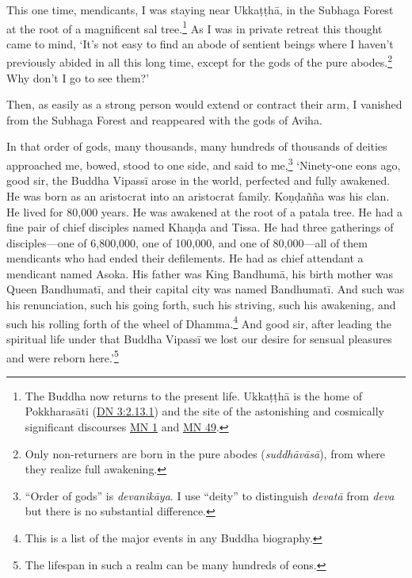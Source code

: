 \documentclass[12pt,openany]{book}%
\begin{document}
This one time, mendicants, I was staying near \textsanskrit{Ukkaṭṭhā}, in the Subhaga Forest at the root of a magnificent sal tree.\footnote{The Buddha now returns to the present life. \textsanskrit{Ukkaṭṭhā} is the home of \textsanskrit{Pokkharasāti} (\href{https://suttacentral.net/dn3/en/sujato\#2.13.1}{DN 3:2.13.1}) and the site of the astonishing and cosmically significant discourses \href{https://suttacentral.net/mn1/en/sujato}{MN 1} and \href{https://suttacentral.net/mn49/en/sujato}{MN 49}. } As I was in private retreat this thought came to mind, ‘It’s not easy to find an abode of sentient beings where I haven’t previously abided in all this long time, except for the gods of the pure abodes.\footnote{Only non-returners are born in the pure abodes (\textit{\textsanskrit{suddhāvāsā}}), from where they realize full awakening. } Why don’t I go to see them?’ 

Then, as easily as a strong person would extend or contract their arm, I vanished from the Subhaga Forest and reappeared with the gods of Aviha. 

In that order of gods, many thousands, many hundreds of thousands of deities approached me, bowed, stood to one side, and said to me,\footnote{“Order of gods” is \textit{\textsanskrit{devanikāya}}. I use “deity” to distinguish \textit{\textsanskrit{devatā}} from \textit{deva} but there is no substantial difference. } ‘Ninety-one eons ago, good sir, the Buddha \textsanskrit{Vipassī} arose in the world, perfected and fully awakened. He was born as an aristocrat into an aristocrat family. \textsanskrit{Koṇḍañña} was his clan. He lived for 80,000 years. He was awakened at the root of a patala tree. He had a fine pair of chief disciples named \textsanskrit{Khaṇḍa} and Tissa. He had three gatherings of disciples—one of 6,800,000, one of 100,000, and one of 80,000—all of them mendicants who had ended their defilements. He had as chief attendant a mendicant named Asoka. His father was King \textsanskrit{Bandhumā}, his birth mother was Queen \textsanskrit{Bandhumatī}, and their capital city was named \textsanskrit{Bandhumatī}. And such was his renunciation, such his going forth, such his striving, such his awakening, and such his rolling forth of the wheel of Dhamma.\footnote{This is a list of the major events in any Buddha biography. } And good sir, after leading the spiritual life under that Buddha \textsanskrit{Vipassī} we lost our desire for sensual pleasures and were reborn here.’\footnote{The lifespan in such a realm can be many hundreds of eons. } 
\end{document}
